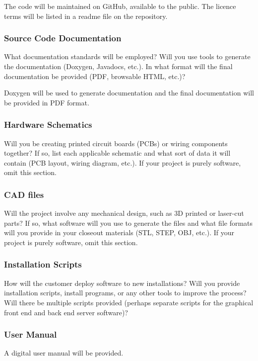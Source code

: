 The code will be maintained on GitHub, available to the public. The licence terms will be listed in a readme file on the repository.

\subsubsection{Source Code Documentation}
What documentation standards will be employed? Will you use tools to generate the documentation (Doxygen, Javadocs, etc.). In what format will the final documentation be provided (PDF, browsable HTML, etc.)?

Doxygen will be used to generate documentation and the final documentation will be provided in PDF format.

\subsubsection{Hardware Schematics}
Will you be creating printed circuit boards (PCBs) or wiring components together? If so, list each applicable schematic and what sort of data it will contain (PCB layout, wiring diagram, etc.). If your project is purely software, omit this section.

\subsubsection{CAD files}
Will the project involve any mechanical design, such as 3D printed or laser-cut parts? If so, what software will you use to generate the files and what file formats will you provide in your closeout materials (STL, STEP, OBJ, etc.). If your project is purely software, omit this section.

\subsubsection{Installation Scripts}
How will the customer deploy software to new installations? Will you provide installation scripts, install programs, or any other tools to improve the process? Will there be multiple scripts provided (perhaps separate scripts for the graphical front end and back end server software)?

\subsubsection{User Manual}

A digital user manual will be provided.
